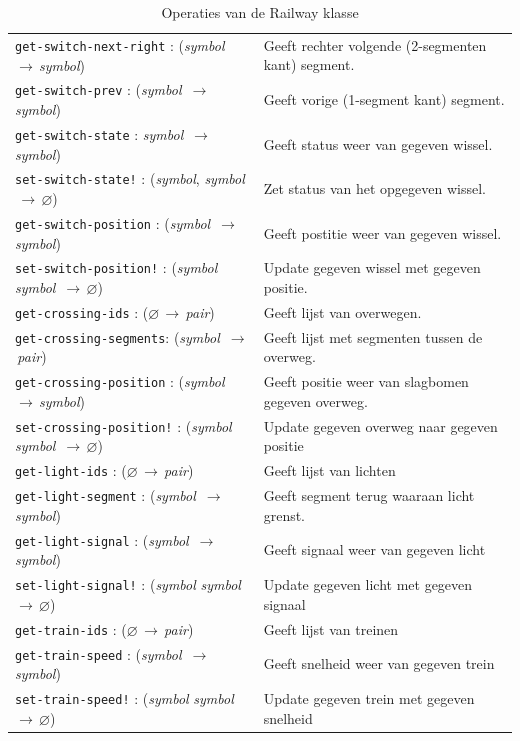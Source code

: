 \documentclass[a4paper, 11pt]{article}
\newcommand{\naar}{\,$\rightarrow$\,}
\renewcommand{\empty}{$\varnothing$}
\newcommand{\<}{\scriptsize\textless\normalsize}
\renewcommand{\>}{\scriptsize\textgreater\normalsize}
\begin{document}
\begin{table}[H]
\begin{center}
{\begin{tabular}{|l l|}
			\texttt{get-switch-next-right} : (\textit{symbol} \naar \textit{symbol}) & Geeft rechter volgende (2-segmenten kant) segment.\\
			\texttt{get-switch-prev} : (\textit{symbol} \naar \textit{symbol}) & Geeft vorige (1-segment kant) segment.\\
			\texttt{get-switch-state} : \textit{symbol} \naar \textit{symbol}) & Geeft status weer van gegeven wissel.\\
			\texttt{set-switch-state!} : (\textit{symbol}, \textit{symbol} \naar \empty) & Zet status van het opgegeven wissel.\\
			\texttt{get-switch-position} : (\textit{symbol} \naar \textit{symbol}) & Geeft postitie weer van gegeven wissel.\\
			\texttt{set-switch-position!} : (\textit{symbol} \textit{symbol} \naar \empty) & Update gegeven wissel met gegeven positie.\\
			\texttt{get-crossing-ids} : (\empty \naar \textit{pair}) & Geeft lijst van overwegen.\\
			\texttt{get-crossing-segments}: (\textit{symbol} \naar \textit{pair}) & Geeft lijst met segmenten tussen de overweg.\\
			\texttt{get-crossing-position} : (\textit{symbol} \naar \textit{symbol}) & Geeft positie weer van slagbomen gegeven overweg.\\
			\texttt{set-crossing-position!} : (\textit{symbol} \textit{symbol} \naar \empty) & Update gegeven overweg naar gegeven positie\\
			\texttt{get-light-ids} : (\empty \naar \textit{pair}) & Geeft lijst van lichten\\
			\texttt{get-light-segment} : (\textit{symbol} \naar \textit{symbol}) & Geeft segment terug waaraan licht grenst.\\
			\texttt{get-light-signal} : (\textit{symbol} \naar \textit{symbol}) & Geeft signaal weer van gegeven licht\\
			\texttt{set-light-signal!} : (\textit{symbol} \textit{symbol} \naar \empty) & Update gegeven licht met gegeven signaal\\
			\texttt{get-train-ids} : (\empty \naar \textit{pair}) & Geeft lijst van treinen\\
			\texttt{get-train-speed} : (\textit{symbol} \naar \textit{symbol}) & Geeft snelheid weer van gegeven trein\\
			\texttt{set-train-speed!} : (\textit{symbol} \textit{symbol} \naar \empty) & Update gegeven trein met gegeven snelheid\\
			\hline
		\end{tabular}}
		\caption{Operaties van de Railway klasse}
	\end{center}
\end{table}
\end{document}
